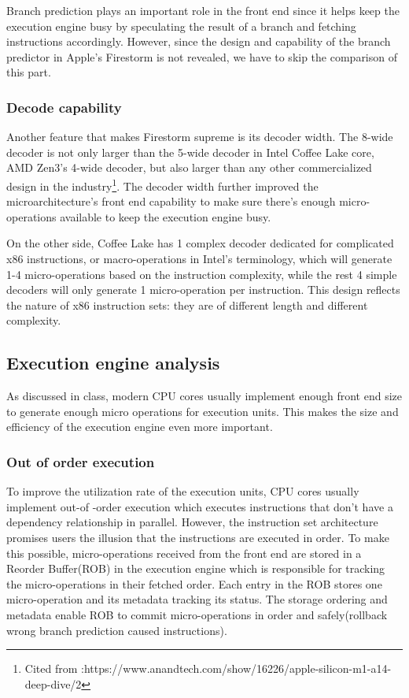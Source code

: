 \documentclass[11pt]{article}
\begin{document}
Branch prediction plays an important role in the front end since it helps keep the execution engine busy by speculating the result of a branch and fetching instructions accordingly. However, since the design and capability of the branch predictor in Apple’s Firestorm is not revealed, we have to skip the comparison of this part.
\subsubsection*{Decode capability}
Another feature that makes Firestorm supreme is its decoder width. The 8-wide decoder is not only larger than the 5-wide decoder in Intel Coffee Lake core, AMD Zen3’s 4-wide decoder, but also larger than any other commercialized design in the industry\footnote{Cited from :https://www.anandtech.com/show/16226/apple-silicon-m1-a14-deep-dive/2}. The decoder width further improved the microarchitecture’s front end capability to make sure there’s enough micro-operations available to keep the execution engine busy. 

On the other side, Coffee Lake has 1 complex decoder dedicated for complicated x86 instructions, or macro-operations in Intel’s terminology, which will generate 1-4 micro-operations based on the instruction complexity, while the rest 4 simple decoders will only generate 1 micro-operation per instruction. This design reflects the nature of x86 instruction sets: they are of different length and different complexity.
\subsection*{Execution engine analysis}
As discussed in class, modern CPU cores usually implement enough front end size to generate enough micro operations for execution units. This makes the size and efficiency of the execution engine even more important.
\subsubsection*{Out of order execution}
To improve the utilization rate of the execution units, CPU cores usually implement out-of -order execution which executes instructions that don’t have a dependency relationship in parallel. However, the instruction set architecture promises users the illusion that the instructions are executed in order. To make this possible, micro-operations received from the front end are stored in a Reorder Buffer(ROB) in the execution engine which is responsible for tracking the micro-operations in their fetched order. Each entry in the ROB stores one micro-operation and its metadata tracking its status. The storage ordering and metadata enable ROB to commit micro-operations in order and safely(rollback wrong branch prediction caused instructions).
\end{document}
